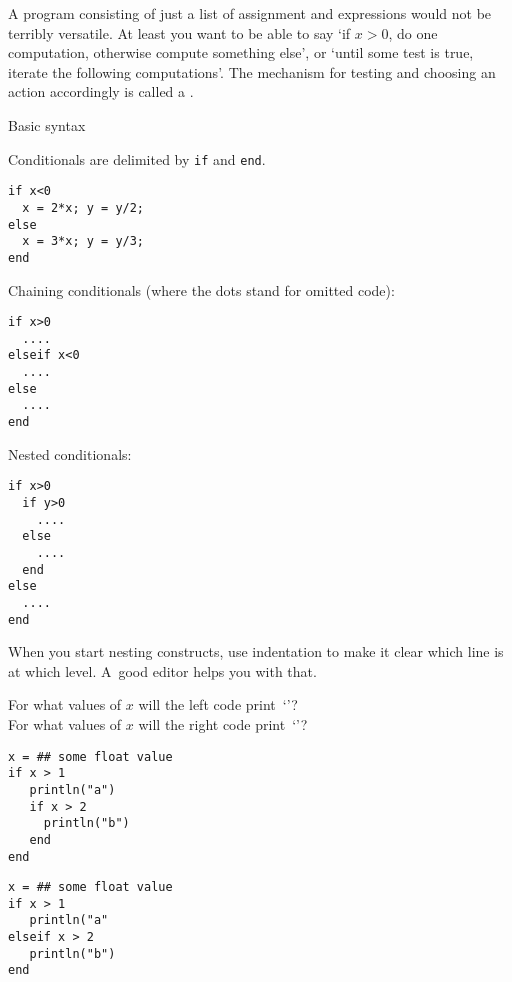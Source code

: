 
A program consisting of just a list of assignment and expressions
would not be terribly versatile. At least you want to be able to say
`if $x>0$, do one computation, otherwise compute something else', or `until some
test is true, iterate the following computations'. The mechanism for
testing and choosing an action accordingly is called a
.

 {Basic syntax}
\label{sec:ifj}

Conditionals are delimited by \lstinline{if} and \lstinline{end}.
\begin{lstlisting}
if x<0
  x = 2*x; y = y/2;
else
  x = 3*x; y = y/3;
end
\end{lstlisting}
Chaining conditionals (where the dots stand for omitted code):
\begin{lstlisting}
if x>0
  ....
elseif x<0
  ....
else
  ....
end
\end{lstlisting}
Nested conditionals:
\begin{lstlisting}
if x>0
  if y>0
    ....
  else
    ....
  end
else
  ....
end
\end{lstlisting}

When you start nesting constructs, use indentation to make it
  clear which line is at which level. A~good editor helps you with that.


\begin{exercise}
  \label{ex:if-scope-abj}
  For what values of $x$ will the left code print~`'?\\
  For what values of $x$ will the right code print~`'?
  \begin{multicols}{2}
\begin{lstlisting}
x = ## some float value
if x > 1
   println("a")
   if x > 2
     println("b")
   end
end
\end{lstlisting}
\columnbreak
\begin{lstlisting}
x = ## some float value
if x > 1
   println("a"
elseif x > 2 
   println("b")
end
\end{lstlisting}
  \end{multicols}
\end{exercise}

